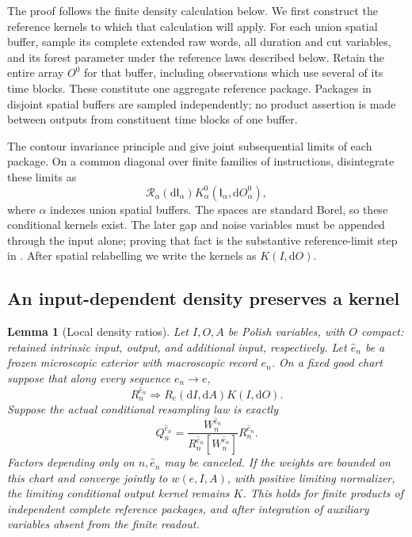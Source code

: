 \documentclass[11pt]{article}
\numberwithin{equation}{section}
\newtheorem{lemma}[theorem]{Lemma}
\theoremstyle{definition}
\theoremstyle{remark}
\newcommand{\dd}{\mathrm d}
\newcommand{\1}{\mathbf 1}
\begin{document}
The proof follows the finite density calculation below. We first
construct the reference kernels to which that calculation will apply.
For each union spatial buffer, sample its complete extended raw words,
all duration and cut variables, and its forest parameter under the
reference laws described below. Retain the entire array \(O^0\) for
that buffer, including observations which use several of its time
blocks. These constitute one aggregate reference package. Packages in
disjoint spatial buffers are sampled independently; no product assertion
is made between outputs from constituent time blocks of one buffer.

The contour invariance principle and  give joint
subsequential limits of each package. On a common diagonal over finite
families of instructions, disintegrate these limits as
\begin{equation}\label{ker:reference-packages}
 \mathcal R_\alpha(\dd\mathsf I_\alpha)
 K^0_\alpha(\mathsf I_\alpha,\dd O^0_\alpha),
\end{equation}
where \(\alpha\) indexes union spatial buffers. The spaces are standard
Borel, so these conditional kernels exist. The later gap and noise
variables must be appended through the input alone; proving that fact
is the substantive reference-limit step in .
After spatial relabelling we write the kernels as \(K(I,\dd O)\).

\subsection{An input-dependent density preserves a kernel}

\begin{lemma}[Local density ratios]\label{ker:density-ratio}
Let \(I,O,A\) be Polish variables, with \(O\) compact: retained
intrinsic input, output, and additional input, respectively.
Let \(\widehat e_n\) be a frozen microscopic exterior with macroscopic
record \(e_n\).  On a fixed good chart suppose that along every
sequence \(e_n\to e\),
\begin{equation}
 R_n^{\widehat e_n}\Longrightarrow R_e(\dd I,\dd A)K(I,\dd O).
 \label{ker:reference-limit}
\end{equation}
Suppose the actual conditional resampling law is exactly
\begin{equation}
 Q_n^{\widehat e_n}
 =\frac{W_n^{\widehat e_n}}{R_n^{\widehat e_n}[W_n^{\widehat e_n}]}
 R_n^{\widehat e_n}.
 \label{ker:exact-ratio}
\end{equation}
Factors depending only on \(n,\widehat e_n\) may be canceled.
If the weights are bounded on this chart and converge jointly to
\(w(e,I,A)\), with positive limiting normalizer, the limiting
conditional output kernel remains \(K\).
This holds for finite products of independent complete reference
packages, and after integration of auxiliary variables absent from
the finite readout.
\end{lemma}
\end{document}
